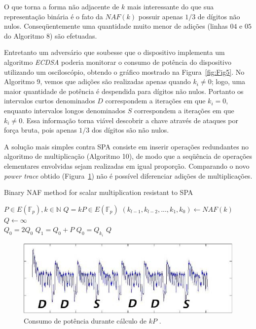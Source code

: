 O que torna a forma n\~{a}o adjacente de $k$ mais interessante do que sua representa\c{c}\~{a}o bin\'{a}ria \'{e} o fato da $NAF(k)$ possuir apenas $1/3$ de d\'{i}gitos n\~{a}o nulos. Conseq\"{u}entemente uma quantidade muito menor de adi\c{c}\~{o}es (linhas $04$ e $05$ do Algoritmo 8) s\~{a}o efetuadas.

Entretanto um advers\'{a}rio que soubesse que o dispositivo implementa um algoritmo \textit{ECDSA} poderia monitorar o consumo de pot\^{e}ncia do dispositivo utilizando um oscilosc\'{o}pio, obtendo o gr\'{a}fico mostrado na Figura~\ref{fig:Fig5}. No Algoritmo 9, vemos que adi\c{c}\~{o}es s\~{a}o realizadas apenas quando $k_{i} \neq 0$; logo, uma maior quantidade de pot\^{e}ncia \'{e} despendida para d\'{i}gitos n\~{a}o nulos. Portanto os intervalos curtos denominados $D$ correspondem a itera\c{c}\~{o}es em que $k_{i} = 0$, enquanto intervalos longos denominados $S$ correspondem a itera\c{c}\~{o}es em que $k_{i} \neq 0$. Essa informa\c{c}\~{a}o torna vi\'{a}vel descobrir a chave atrav\'{e}s de ataques por for\c{c}a bruta, pois apenas $1/3$ dos d\'{i}gitos s\~{a}o n\~{a}o nulos.

A solu\c{c}\~{a}o mais simples contra SPA consiste em inserir opera\c{c}\~{o}es redundantes no algoritmo de multiplica\c{c}\~{a}o (Algoritmo 10), de modo que a seq\"{u}\^{e}ncia de opera\c{c}\~{o}es elementares envolvidas sejam realizadas em igual propor\c{c}\~{a}o. Comparando o novo \textit{power trace} obtido (Figura~\ref{fig:Fig7}) n\~{a}o \'{e} poss\'{i}vel diferenciar adi\c{c}\~{o}es de multiplica\c{c}\~{o}es.

\begin{algorithm}[H]
\caption{Binary NAF method for scalar multiplication resistant to SPA}
\begin{algorithmic}
    \REQUIRE $P \in E(\mathbb{F}_p), k \in \mathbb{N}$
    \ENSURE $Q = kP \in E(\mathbb{F}_p)$
    \STATE $(k_{l-1}, k_{l-2}, ..., k_{1}, k_{0}) \leftarrow NAF(k)$
    \STATE $Q \leftarrow \infty$\\
        \STATE $Q_{0} = 2Q_{0}$
        \STATE $Q_{1} = Q_{0} + P$
        \STATE $Q_{0} = Q_{k_{i}}$
    \ENDFOR
    \RETURN $Q$
    \end{algorithmic}
\end{algorithm}

\begin{figure}[ht]
	\centering
	\includegraphics[width=.8\textwidth]{figures/spa2.jpg}
	\caption{Consumo de pot\^{e}ncia durante c\'{a}lculo de $kP$ \cite{ECCBook_HankersonVanstone2004}.}
	\label{fig:Fig7}
\end{figure}

